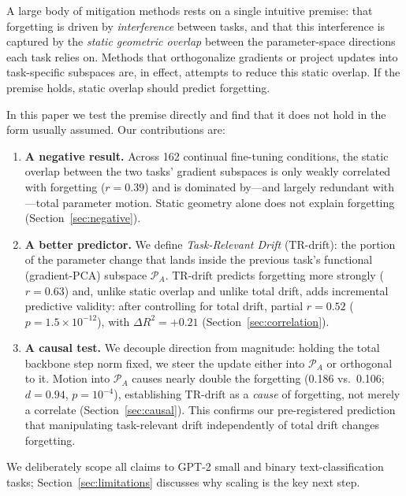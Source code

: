 \documentclass[11pt]{article}
\newcommand{\trdrift}{\mathrm{TR\text{-}drift}}
\newcommand{\PA}{\mathcal{P}_A}
\begin{document}
A large body of mitigation methods rests on a single intuitive premise: that
forgetting is driven by \emph{interference} between tasks, and that this
interference is captured by the \emph{static geometric overlap} between the
parameter-space directions each task relies on. Methods that orthogonalize
gradients or project updates into task-specific subspaces are, in effect,
attempts to reduce this static overlap. If the premise holds, static overlap
should predict forgetting.

In this paper we test the premise directly and find that it does not hold in the
form usually assumed. Our contributions are:

\begin{enumerate}
    \item \textbf{A negative result.} Across 162 continual fine-tuning
    conditions, the static overlap between the two tasks' gradient subspaces is
    only weakly correlated with forgetting ($r=0.39$) and is dominated by---and
    largely redundant with---total parameter motion. Static geometry alone does
    not explain forgetting (Section~\ref{sec:negative}).

    \item \textbf{A better predictor.} We define \emph{Task-Relevant Drift}
    ($\trdrift$): the portion of the parameter change that lands inside the
    previous task's functional (gradient-PCA) subspace $\PA$. $\trdrift$
    predicts forgetting more strongly ($r=0.63$) and, unlike static overlap and
    unlike total drift, adds incremental predictive validity: after controlling
    for total drift, partial $r=0.52$ ($p=1.5\times10^{-12}$), with
    $\Delta R^2=+0.21$ (Section~\ref{sec:correlation}).

    \item \textbf{A causal test.} We decouple direction from magnitude: holding
    the total backbone step norm fixed, we steer the update either into $\PA$ or
    orthogonal to it. Motion into $\PA$ causes nearly double the forgetting
    (0.186 vs.\ 0.106; $d=0.94$, $p=10^{-4}$), establishing $\trdrift$ as a
    \emph{cause} of forgetting, not merely a correlate
    (Section~\ref{sec:causal}). This confirms our pre-registered prediction
    that manipulating task-relevant drift independently of total drift changes
    forgetting.
\end{enumerate}

We deliberately scope all claims to GPT-2 small and binary text-classification
tasks; Section~\ref{sec:limitations} discusses why scaling is the key next step.
\end{document}
